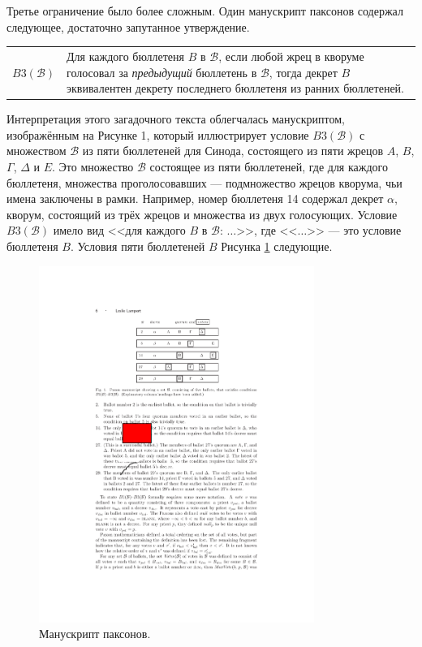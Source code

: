 \documentclass[12pt, a4paper]{article} %
\begin{document}
Третье ограничение было более сложным. Один манускрипт паксонов содержал следующее, достаточно запутанное утверждение.
\begin{table}[h]
\begin{tabular}{l p{10.5cm}}
    $B3(\mathcal{B})$ & Для каждого бюллетеня $B$ в $\mathcal{B}$, если любой жрец в кворуме голосовал за \textit{предыдущий} бюллетень в $\mathcal{B}$, тогда декрет $B$ эквивалентен декрету последнего бюллетеня из ранних бюллетеней. 
\end{tabular}
\end{table}

Интерпретация этого загадочного текста облегчалась манускриптом, изображённым на Рисунке 1, который иллюстрирует условие $B3(\mathcal{B})$ с множеством $\mathcal{B}$ из пяти бюллетеней для Синода, состоящего из пяти жрецов $A$, $B$, $\Gamma$, $\Delta$ и $E$. Это множество $\mathcal{B}$ состоящее из пяти бюллетеней, где для каждого бюллетеня, множества проголосовавших --- подмножество жрецов кворума, чьи имена заключены в рамки. Например, номер бюллетеня 14 содержал декрет $\alpha$, кворум, состоящий из трёх жрецов и множества из двух голосующих. Условие $B3(\mathcal{B})$ имело вид <<для каждого $B$ в $\mathcal{B}$: $\ldots$>>, где <<$\ldots$>> --- это условие бюллетеня $B$. Условия пяти бюллетеней $B$ Рисунка \ref{fig:paxonmanu} следующие.

\begin{figure}[h]
 \centering
    \includegraphics[width=0.8\textwidth]{images/Paxon-manuscript.pdf}
    \caption{Манускрипт паксонов.}
    \label{fig:paxonmanu}
\end{figure}
\end{document}
